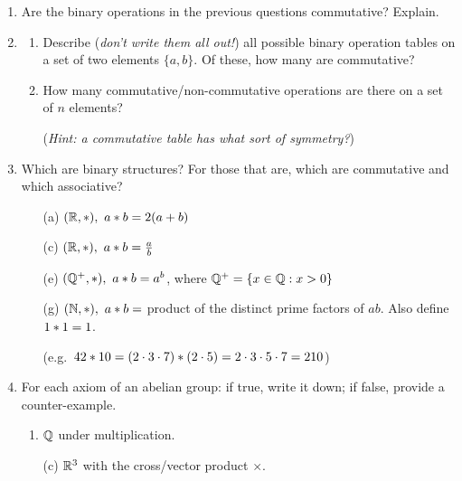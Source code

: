 \begin{exercises}
\begin{enumerate}
	
		\item Are the binary operations in the previous questions commutative? Explain.
	
	
		\item\begin{enumerate}
		  \item Describe (\emph{don't write them all out!}) all possible binary operation tables on a set of two elements $\{a,b\}$. Of these, how many are commutative?
		  
		  \item How many commutative/non-commutative operations are there on a set of \emph{$n$} elements?\par
		  (\emph{Hint: a commutative table has what sort of symmetry?})
		\end{enumerate}
		
	  
	  \item Which are binary structures? For those that are, which are commutative and which associative?
	  \begin{enumerate}%
	    \item[(a)]  $(\mathbb{R},*),\ a\mathbin{\ast} b=2(a+b)$
	    
	    \item[(c)]  $(\mathbb{R},*),\ a\mathbin{\ast} b=\frac ab$\setcounter{enumii}{4}
	    
	    \item[(e)]  $(\mathbb{Q}^+,*),\ a\mathbin{\ast}  b=a^b$,  where $\mathbb{Q}^+=\{x\in\mathbb{Q}:x>0\}$
	    
	    \item[(g)] $(\mathbb{N},*),\ a\mathbin{\ast} b=$ product of the distinct prime factors of $ab$. Also define $1\mathbin{\ast} 1=1$.\par
	    (e.g.~$42\mathbin{\ast} 10=(2\cdot 3\cdot 7)\mathbin{\ast} (2\cdot 5)=2\cdot 3\cdot 5\cdot 7=210$) 
	  \end{enumerate}
	  
	
	  \goodbreak
	  
	  
		\item For each axiom of an abelian group: if true, write it down; if false, provide a counter-example.
		\begin{enumerate}
		  \item {} $\mathbb{Q}$ under multiplication.\setcounter{enumii}{2}
		  
		  \item[(c)]  $\mathbb{R}^3$ with the cross/vector product $\times$.\setcounter{enumii}{4}
		  

\end{enumerate}
\end{enumerate}
\end{exercises}
